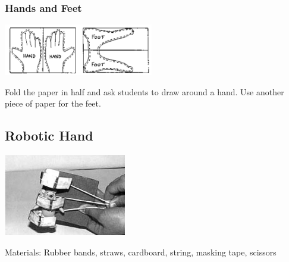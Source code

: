 \begin{multicols}{2}
\subsubsection{Hands and Feet}

\begin{center}
\includegraphics[width=0.49\textwidth]{./img/source/skeleton-hands-feet.png}
\end{center}
Fold the paper in half and ask students to draw around a hand. Use
another piece of paper for the feet.

\subsection{Robotic Hand}

\begin{center}
\includegraphics[width=0.4\textwidth]{./img/robotic-hand-use.jpg}
\end{center}

\begin{description*}
\item[Materials:]{Rubber bands, straws, cardboard, string, masking tape, scissors}
\end{description*}


\end{multicols}
